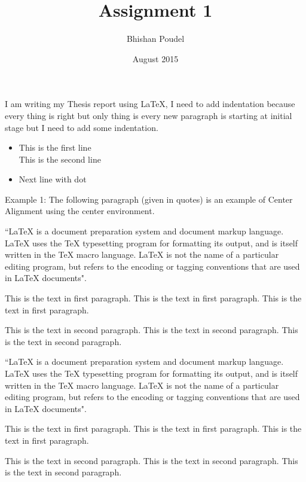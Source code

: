 \documentclass[12pt]{article}
\title{Assignment 1}
\author{Bhishan Poudel}
\date{August 2015}
\begin{document}
\setlength\parindent{24pt}

I am writing my Thesis report using LaTeX, I need to add indentation because 
every thing is right but only thing is every new paragraph is starting at 
initial stage but I need to add some indentation. 


\begin{itemize}
    \item This is the first line \\ %
          This is the second line   %
    \item Next line with dot
\end{itemize}




\begin{center}
Example 1: The following paragraph (given in quotes) is an 
example of Center Alignment using the center environment. 
 
``LaTeX is a document preparation system and document markup 
language. LaTeX uses the TeX typesetting program for formatting 
its output, and is itself written in the TeX macro language. 
LaTeX is not the name of a particular editing program, but 
refers to the encoding or tagging conventions that are used 
in LaTeX documents".
\end{center}

This is the text in first paragraph. This is the text in first 
paragraph. This is the text in first paragraph. \par
This is the text in second paragraph. This is the text in second 
paragraph. This is the text in second paragraph.




\begin{flushleft}
``LaTeX is a document preparation system and document markup 
language. LaTeX uses the TeX typesetting program for formatting 
its output, and is itself written in the TeX macro language. 
LaTeX is not the name of a particular editing program, but refers 
to the encoding or tagging conventions that are used in LaTeX documents".
\end{flushleft}

\setlength{\parindent}{10ex}
This is the text in first paragraph. This is the text in first 
paragraph. This is the text in first paragraph. \par
\noindent %
This is the text in second paragraph. This is the text in second 
paragraph. This is the text in second paragraph.
\end{document}
